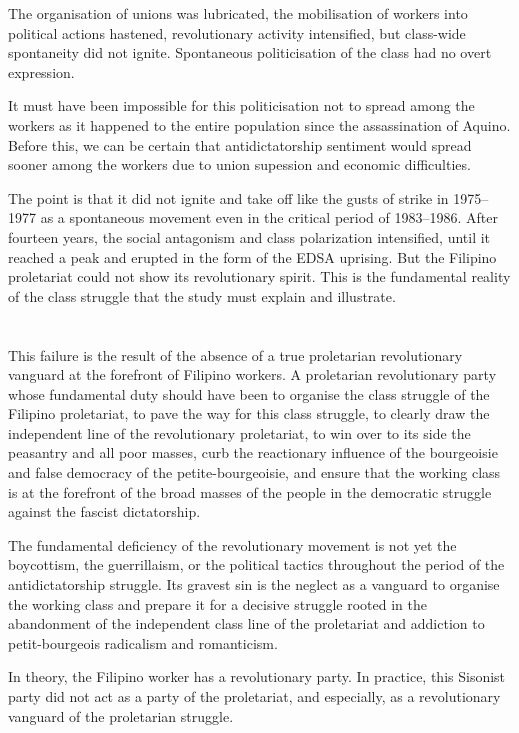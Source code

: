The organisation of unions was lubricated,
the mobilisation of workers
into political actions hastened,
revolutionary activity intensified,
but class-wide spontaneity did not ignite. 
Spontaneous politicisation of the class 
had no overt expression.

It must have been impossible for this politicisation 
not to spread among the workers
as it happened to the entire population 
since the assassination of Aquino. 
Before this, we can be certain
that antidictatorship sentiment 
would spread sooner 
among the workers
due to union supession and economic difficulties.

The point is that it did not ignite and take off 
like the gusts of strike in 1975--1977 
as a spontaneous movement even in the critical period of 1983--1986. 
After fourteen years, 
the social antagonism and class polarization intensified,
until it reached a peak and erupted 
in the form of the EDSA uprising. 
But the Filipino proletariat could not show its revolutionary spirit. 
This is the fundamental reality of the class struggle 
that the study must explain and illustrate.


\section{}
This failure 
is the result 
of the absence 
of a true proletarian revolutionary vanguard
at the forefront of Filipino workers.
A proletarian revolutionary party whose fundamental duty should have been
to organise the class struggle of the Filipino proletariat, 
to pave the way for this class struggle, 
to clearly draw the independent line of the revolutionary proletariat, 
to win over to its side the peasantry and all poor masses, 
curb the reactionary influence of the bourgeoisie 
and false democracy of the petite-bourgeoisie, 
and ensure that the working class 
is at the forefront of the broad masses of the people 
in the democratic struggle against the fascist dictatorship.

The fundamental deficiency of the revolutionary movement 
is not yet the boycottism, 
the guerrillaism, 
or the political tactics 
throughout the period of the antidictatorship struggle. 
Its gravest sin 
is the neglect as a vanguard 
to organise the working class 
and prepare it for a decisive struggle 
rooted in the abandonment of the independent class line of the proletariat
and addiction to petit-bourgeois radicalism and romanticism.

In theory,
the Filipino worker has a revolutionary party.
In practice,
this Sisonist party 
did not act as a party of the proletariat,
and especially,
as a revolutionary vanguard of the proletarian struggle.


